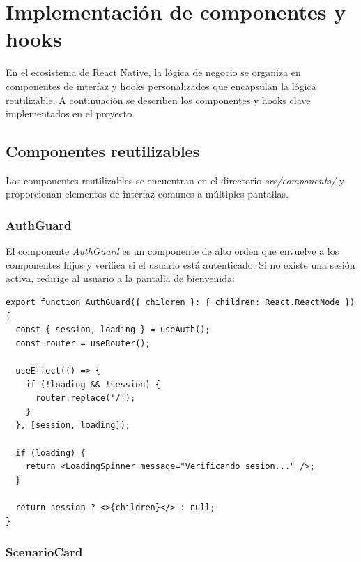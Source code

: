 
\section{Implementaci\'on de componentes y hooks}

En el ecosistema de React Native, la l\'ogica de negocio se organiza en
componentes de interfaz y hooks personalizados que encapsulan la l\'ogica
reutilizable. A continuaci\'on se describen los componentes y hooks clave
implementados en el proyecto.

\subsection{Componentes reutilizables}

Los componentes reutilizables se encuentran en el directorio
\textit{src/components/} y proporcionan elementos de interfaz comunes a
m\'ultiples pantallas.

\subsubsection{AuthGuard}

El componente \textit{AuthGuard} es un componente de alto orden que envuelve
a los componentes hijos y verifica si el usuario est\'a autenticado. Si no
existe una sesi\'on activa, redirige al usuario a la pantalla de bienvenida:

\begin{lstlisting}
export function AuthGuard({ children }: { children: React.ReactNode }) {
  const { session, loading } = useAuth();
  const router = useRouter();

  useEffect(() => {
    if (!loading && !session) {
      router.replace('/');
    }
  }, [session, loading]);

  if (loading) {
    return <LoadingSpinner message="Verificando sesion..." />;
  }

  return session ? <>{children}</> : null;
}
\end{lstlisting}

\subsubsection{ScenarioCard}

